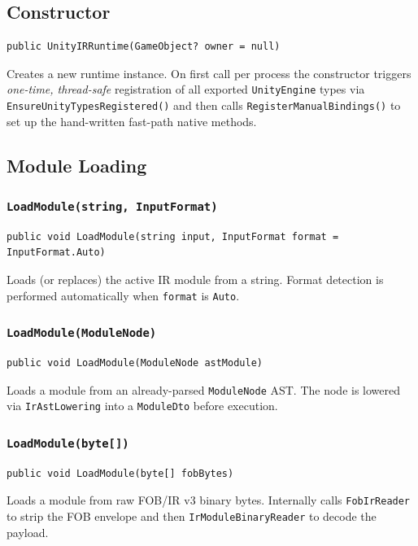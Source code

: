 \documentclass[11pt,a4paper]{article}
\newcommand{\code}[1]{\texttt{\small #1}}
\newcommand{\typename}[1]{\textcolor{typecolor}{\texttt{\small #1}}}
\begin{document}
\subsection{Constructor}

\begin{lstlisting}[style=cs]
public UnityIRRuntime(GameObject? owner = null)
\end{lstlisting}

Creates a new runtime instance. On first call per process the constructor triggers
\emph{one-time, thread-safe} registration of all exported \code{UnityEngine} types
via \code{EnsureUnityTypesRegistered()} and then calls \code{RegisterManualBindings()}
to set up the hand-written fast-path native methods.

\subsection{Module Loading}

\subsubsection{\texttt{LoadModule(string, InputFormat)}}
\begin{lstlisting}[style=cs]
public void LoadModule(string input, InputFormat format = InputFormat.Auto)
\end{lstlisting}
Loads (or replaces) the active IR module from a string. Format detection is
performed automatically when \code{format} is \code{Auto}.

\subsubsection{\texttt{LoadModule(ModuleNode)}}
\begin{lstlisting}[style=cs]
public void LoadModule(ModuleNode astModule)
\end{lstlisting}
Loads a module from an already-parsed \typename{ModuleNode} AST. The node is lowered
via \typename{IrAstLowering} into a \typename{ModuleDto} before execution.

\subsubsection{\texttt{LoadModule(byte[])}}
\begin{lstlisting}[style=cs]
public void LoadModule(byte[] fobBytes)
\end{lstlisting}
Loads a module from raw FOB/IR v3 binary bytes. Internally calls
\typename{FobIrReader} to strip the FOB envelope and then
\typename{IrModuleBinaryReader} to decode the payload.
\end{document}
